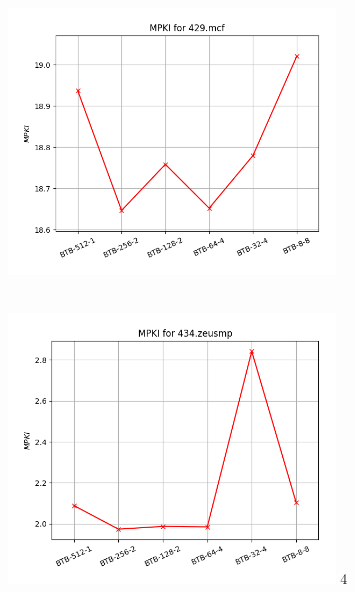    \begin{minipage}{\textwidth}
      \begin{center}
         \\
         \vspace{3mm}
         \includegraphics[width=0.65\textwidth, frame]{./graphs/4-3/429-mcf.png}
         \vspace{6mm}
      \end{center}
   \end{minipage}

   \begin{minipage}{\textwidth}
      \begin{center}
         \\
         \vspace{3mm}
         \includegraphics[width=0.65\textwidth, frame]{./graphs/4-3/434-zeusmp.png}
         \vspace{6mm}4
      \end{center}
   \end{minipage}

